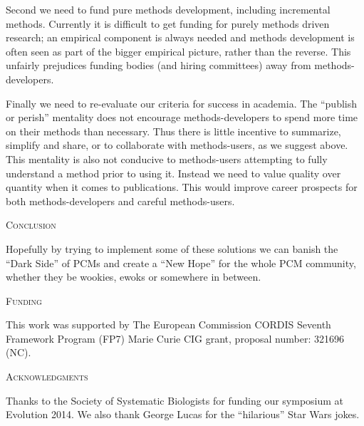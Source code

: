 \documentclass[a4paper,12pt]{article}
\renewcommand{\section}[1]{
  \bigskip
  \begin{center}
  \begin{Large}
  \normalfont\scshape #1
  \medskip
  \end{Large}
  \end{center}
}
\begin{document}
Second we need to fund pure methods development, including incremental methods. 
Currently it is difficult to get funding for purely methods driven research; an empirical component is always needed and methods development is often seen as part of the bigger empirical picture, rather than the reverse. 
This unfairly prejudices funding bodies (and hiring committees) away from methods-developers. 

Finally we need to re-evaluate our criteria for success in academia. 
The ``publish or perish'' mentality does not encourage methods-developers to spend more time on their methods than necessary. 
Thus there is little incentive to summarize, simplify and share, or to collaborate with methods-users, as we suggest above. 
This mentality is also not conducive to methods-users attempting to fully understand a method prior to using it. 
Instead we need to value quality over quantity when it comes to publications.
This would improve career prospects for both methods-developers and careful methods-users.

\section{Conclusion}

Hopefully by trying to implement some of these solutions we can banish the ``Dark Side'' of PCMs and create a ``New Hope'' for the whole PCM community, whether they be wookies, ewoks or somewhere in between.

\section{Funding}
This work was supported by The European Commission CORDIS Seventh Framework Program (FP7) Marie Curie CIG grant, proposal number: 321696 (NC). 

\section{Acknowledgments}
Thanks to the Society of Systematic Biologists for funding our symposium at Evolution 2014. 
We also thank George Lucas for the ``hilarious'' Star Wars jokes.



\end{document}
